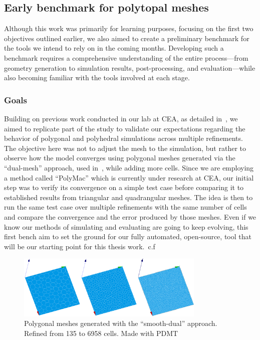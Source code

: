 \documentclass{article}
\begin{document}
\subsection{Early benchmark for polytopal meshes}

Although this work was primarily for learning purposes, focusing on the first two objectives outlined earlier, we also aimed to create a preliminary benchmark for the tools we intend to rely on in the coming months. Developing such a benchmark requires a comprehensive understanding of the entire process—from geometry generation to simulation results, post-processing, and evaluation—while also becoming familiar with the tools involved at each stage.

\subsubsection{Goals}
Building on previous work conducted in our lab at CEA, as detailed in~\cite{nora2022dualPoly}, we aimed to replicate part of the study to validate our expectations regarding the behavior of polygonal and polyhedral simulations across multiple refinements. The objective here was not to adjust the mesh to the simulation, but rather to observe how the model converges using polygonal meshes generated via the ``dual-mesh'' approach, used in~\cite{bishop2020polyhedral}, while adding more cells. Since we are employing a method called ``PolyMac'' which is currently under research at CEA, our initial step was to verify its convergence on a simple test case before comparing it to established results from triangular and quadrangular meshes. The idea is then to run the same test case over multiple refinements with the same number of cells and compare the convergence and the error produced by those meshes. Even if we know our methods of simulating and evaluating are going to keep evolving, this first bench aim to set the ground for our fully automated, open-source, tool that will be our starting point for this thesis work.~c.f~\cite{nrechati_BenchReMesh}

\begin{figure}[htbp]
	\centering
	\includegraphics[width=0.8\textwidth]{./Images/polyMesh}
	\caption{\label{fig:polyMesh} Polygonal meshes generated with the ``smooth-dual'' approach. Refined from 135 to 6958 cells. Made with PDMT~\cite{Badri_pdmt}}
\end{figure}
\end{document}
